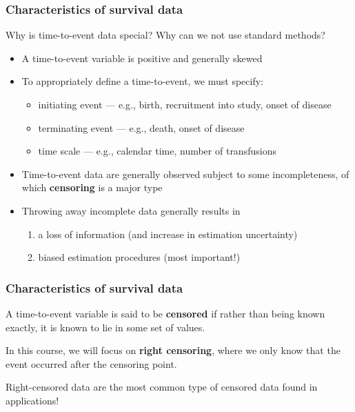 \documentclass[12pt, 
hyperref={colorlinks=true, linkcolor=blue, urlcolor=cyan},dvipsnames]{beamer}
\begin{document}
\begin{frame}
\frametitle{Characteristics of survival data}
Why is time-to-event data special? Why can we not use standard methods? \vspace{-0.5cm}
\begin{itemize}
\item A time-to-event variable is positive and generally skewed
\item To appropriately define a time-to-event, we must specify:
{\scriptsize
\begin{itemize}
\item initiating event --- e.g., birth, recruitment into study, onset of disease
\item terminating event --- e.g., death, onset of disease
\item time scale --- e.g., calendar time, number of transfusions
\end{itemize}
}
\item Time-to-event data are generally observed subject to some incompleteness, of which \textbf{censoring} is a major type
\item Throwing away incomplete data generally results in
{\scriptsize
\begin{enumerate}
\item a loss of information (and increase in estimation uncertainty)
\item biased estimation procedures (most important!)
\end{enumerate}
}
\end{itemize}

\end{frame}

\begin{frame}
\frametitle{Characteristics of survival data}
A time-to-event variable is said to be \textbf{censored} if rather than being known exactly, it is known to lie in some set of values.

In this course, we will focus on \textbf{right censoring}, where we only know that the event occurred after the censoring point.

Right-censored data are the most common type of censored data found in applications!
\end{frame}
\end{document}
